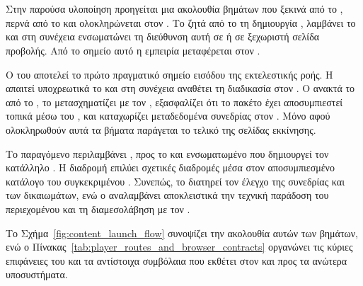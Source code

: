 \section{}
\label{sec:scorm_content_launch_flow}

Στην παρούσα υλοποίηση προηγείται μια ακολουθία βημάτων που ξεκινά από το , περνά από το  και ολοκληρώνεται στον . Το  ζητά από το  τη δημιουργία , λαμβάνει το \texttt{} και στη συνέχεια ενσωματώνει τη διεύθυνση αυτή σε  ή σε ξεχωριστή σελίδα προβολής. Από το σημείο αυτό η  εμπειρία μεταφέρεται στον .

Ο  \texttt{} του  αποτελεί το πρώτο πραγματικό σημείο εισόδου της εκτελεστικής ροής. Η \texttt{} απαιτεί υποχρεωτικά το  \texttt{} και στη συνέχεια αναθέτει τη διαδικασία στον \texttt{}. Ο \texttt{} ανακτά το  από το , το μετασχηματίζει με τον \texttt{}, εξασφαλίζει ότι το πακέτο έχει αποσυμπιεστεί τοπικά μέσω του \texttt{}, και καταχωρίζει μεταδεδομένα συνεδρίας στον \texttt{}. Μόνο αφού ολοκληρωθούν αυτά τα βήματα παράγεται το τελικό  της σελίδας εκκίνησης.

Το παραγόμενο  περιλαμβάνει ,  προς το \texttt{} και ενσωματωμένο  που δημιουργεί τον κατάλληλο . Η διαδρομή \texttt{} επιλύει σχετικές διαδρομές μέσα στον αποσυμπιεσμένο κατάλογο του συγκεκριμένου . Συνεπώς, το  διατηρεί τον έλεγχο της συνεδρίας και των δικαιωμάτων, ενώ ο  αναλαμβάνει αποκλειστικά την τεχνική παράδοση του περιεχομένου και τη διαμεσολάβηση με τον .

Το Σχήμα~\ref{fig:content_launch_flow} συνοψίζει την ακολουθία αυτών των βημάτων, ενώ ο Πίνακας~\ref{tab:player_routes_and_browser_contracts} οργανώνει τις κύριες επιφάνειες του  και τα αντίστοιχα συμβόλαια που εκθέτει στον  και προς τα ανώτερα υποσυστήματα.



\begin{table}[H]
\centering
\caption{Κύριες διαδρομές του  και συμβόλαια αλληλεπίδρασης με τον  και το }
\label{tab:player_routes_and_browser_contracts}

\end{table}
